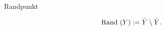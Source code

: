 \documentclass[class=article, crop=false]{standalone}
\begin{document}
\begin{zettel}{Randpunkt}
\begin{flashcard}
    \begin{definition}[Rand]
        \[
            \tx{ Rand}(Y) := \bar{Y}  \setminus \dot{Y}
        .\]
        
    \end{definition}
\end{flashcard}
\end{zettel}
\end{document}
